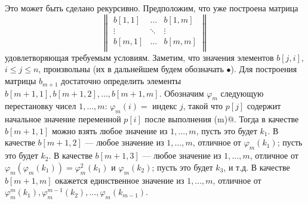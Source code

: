 \documentclass[12pt,a4paper]{article}
\theoremstyle{plain}
\theoremstyle{definition}
\theoremstyle{remark}
\let\phi\varphi
\begin{document}
Это может быть сделано рекурсивно. Предположим, что уже построена матрица
\[ \begin{Vmatrix}
b[1,1] & \dots & b[1,m] \\
\vdots & \ddots & \vdots \\
b[m,1] & \dots & b[m,m] \\
\end{Vmatrix}
\]
удовлетворяющая требуемым условиям. Заметим, что значения элементов $b[j,i]$, $i\le j\le n$, произвольны (их в дальнейшем будем обозначать $\bullet$). Для построения матрицы $b_{m+1}$ достаточно определить элементы $b[m+1,1], b[m+1,2], \ldots, b[m+1,m]$. Обозначим $\phi_m$ следующую перестановку чисел $1,\ldots,m$: $\phi_m(i) = $ индекс $j$, такой что $p[j]$ содержит начальное значение переменной $p[i]$ после выполнения \verb@PERM(m)@. Тогда в качестве $b[m+1,1]$ можно взять любое значение из $1,\ldots,m$, пусть это будет $k_1$. В качестве $b[m+1,2]$ --- любое значение из $1,\ldots,m$, отличное от $\phi_m(k_1)$; пусть это будет $k_2$. В качестве $b[m+1,3]$ --- любое значение из $1,\ldots,m$, отличное от $\phi_m(\phi_m(k_1)) = \phi_m^2(k_1)$ и $\phi_m(k_2)$; пусть это будет $k_3$, и т.д. В качестве $b[m+1,m]$ окажется единственное значение из $1,\ldots,m$, отличное от $\phi_m^m(k_1), \phi_m^{m-1}(k_2), \ldots, \phi_m(k_{m-1})$.
\end{document}
